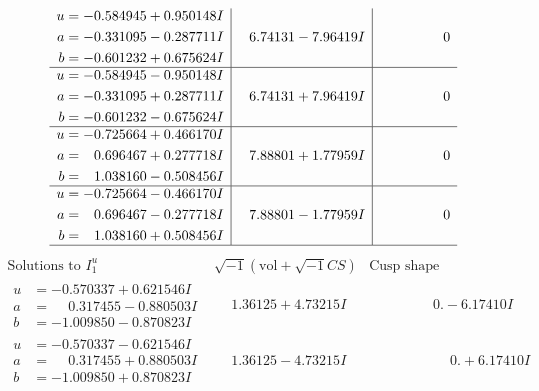 \documentclass[1p]{elsarticle_modified}
\theoremstyle{definition}
\newcommand{\I}{\sqrt{-1}}
\begin{document}
$$\begin{array}{c|c|c}
\begin{aligned}
u &= -0.584945 + 0.950148 I \\
a &= -0.331095 - 0.287711 I \\
b &= -0.601232 + 0.675624 I\end{aligned}
 & \phantom{-}6.74131 - 7.96419 I & \phantom{-0.000000 } 0 \\ \hline\begin{aligned}
u &= -0.584945 - 0.950148 I \\
a &= -0.331095 + 0.287711 I \\
b &= -0.601232 - 0.675624 I\end{aligned}
 & \phantom{-}6.74131 + 7.96419 I & \phantom{-0.000000 } 0 \\ \hline\begin{aligned}
u &= -0.725664 + 0.466170 I \\
a &= \phantom{-}0.696467 + 0.277718 I \\
b &= \phantom{-}1.038160 - 0.508456 I\end{aligned}
 & \phantom{-}7.88801 + 1.77959 I & \phantom{-0.000000 } 0 \\ \hline\begin{aligned}
u &= -0.725664 - 0.466170 I \\
a &= \phantom{-}0.696467 - 0.277718 I \\
b &= \phantom{-}1.038160 + 0.508456 I\end{aligned}
 & \phantom{-}7.88801 - 1.77959 I & \phantom{-0.000000 } 0\\
 \hline 
 \end{array}$$\newpage$$\begin{array}{c|c|c}  
\text{Solutions to }I^u_{1}& \I (\text{vol} + \sqrt{-1}CS) & \text{Cusp shape}\\
 \hline 
\begin{aligned}
u &= -0.570337 + 0.621546 I \\
a &= \phantom{-}0.317455 - 0.880503 I \\
b &= -1.009850 - 0.870823 I\end{aligned}
 & \phantom{-}1.36125 + 4.73215 I & \phantom{-0.000000 } 0. - 6.17410 I \\ \hline\begin{aligned}
u &= -0.570337 - 0.621546 I \\
a &= \phantom{-}0.317455 + 0.880503 I \\
b &= -1.009850 + 0.870823 I\end{aligned}
 & \phantom{-}1.36125 - 4.73215 I & \phantom{-0.000000 -}0. + 6.17410 I \\ \hline\begin{aligned}

\end{aligned}
\end{array}$$
\end{document}
